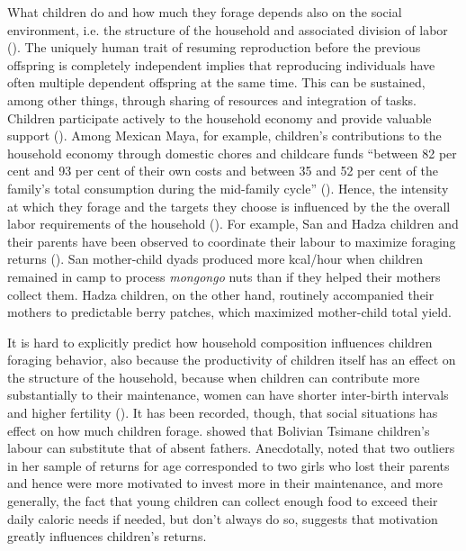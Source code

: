 What children do and how much they forage depends also on the social environment, i.e. the structure of the household and associated division of labor (\cite{bock_evolutionary_2002}). The uniquely human trait of resuming reproduction before the previous offspring is completely independent implies that reproducing individuals have often multiple dependent offspring at the same time. This can be sustained, among other things, through sharing of resources and integration of tasks. Children participate actively to the household economy and provide valuable support (\cite{cain_economic_1977}). Among Mexican Maya, for example, children’s contributions to the household economy through domestic chores and childcare funds “between 82 per cent and 93 per cent of their own costs and between 35 and 52 per cent of the family’s total consumption during the mid-family cycle” (\cite{kramer_variation_2002, kramer_maya_2005, kramer_childrens_2005, kramer_does_2009}). Hence, the intensity at which they forage and the targets they choose is influenced by the the overall labor requirements of the household (\cite{bock_evolutionary_2002}). For example, San and Hadza children and their parents have been observed to coordinate their labour to maximize foraging returns (\cite{hawkes_hadza_1995}). San mother-child dyads produced more kcal/hour when children remained in camp to process \textit{mongongo} nuts than if they helped their mothers collect them. Hadza children, on the other hand, routinely accompanied their mothers to predictable berry patches, which maximized mother-child total yield.

It is hard to explicitly predict how household composition influences children foraging behavior, also because the productivity of children itself has an effect on the structure of the household, because when children can contribute more substantially to their maintenance, women can have shorter inter-birth intervals and higher fertility (\cite{blurton_jones_modelling_1989}). It has been recorded, though, that social situations has effect on how much children forage. \cite{stieglitz_household_2013} showed that Bolivian Tsimane children’s labour can substitute that of absent fathers. Anecdotally, \cite{crittenden_juvenile_2013} noted that two outliers in her sample of returns for age corresponded to two girls who lost their parents and hence were more motivated to invest more in their maintenance, and more generally, the fact that young children can collect enough food to exceed their daily caloric needs if needed, but don't always do so, suggests that motivation greatly influences children’s returns. 

